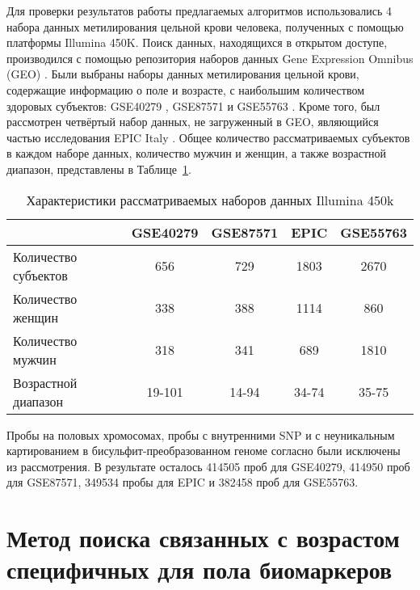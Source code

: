 Для проверки результатов работы предлагаемых алгоритмов использовались 4 набора данных метилирования цельной крови человека, полученных с помощью платформы Illumina 450K. Поиск данных, находящихся в открытом доступе, производился с помощью репозитория наборов данных Gene Expression Omnibus (GEO) \autocite{Barrett2012}. Были выбраны наборы данных метилирования цельной крови, содержащие информацию о поле и возрасте, с наибольшим количеством здоровых субъектов: GSE40279 \autocite{Hannum2013}, GSE87571 \autocite{Johansson2013} и GSE55763 \autocite{Lehne2015}. Кроме того, был рассмотрен четвёртый набор данных, не загруженный в GEO, являющийся частью исследования EPIC Italy \autocite{Palli2003}. Общее количество рассматриваемых субъектов в каждом наборе данных, количество мужчин и женщин, а также возрастной диапазон, представлены в Таблице~\ref{tab:Datasets}. 

\begin{table} [htbp]
	\centering
	\begin{threeparttable}
		\caption{Характеристики рассматриваемых наборов данных Illumina 450k}\label{tab:Datasets}
		\begin{SingleSpace}
			\begin{tabular}{| l | c | c | c | c |}
				\hline
				 & GSE40279 & GSE87571 & EPIC & GSE55763 \\
				\hline
				Количество субъектов & 656 & 729 & 1803 & 2670 \\
				\hline
				Количество женщин & 338 & 388 & 1114 & 860 \\
				\hline
				Количество мужчин & 318 & 341 & 689 & 1810 \\
				\hline
				Возрастной диапазон & 19-101 & 14-94 & 34-74 & 35-75 \\
				\hline
			\end{tabular}%
		\end{SingleSpace}
	\end{threeparttable}
\end{table}

Пробы на половых хромосомах, пробы с внутренними SNP и с неуникальным картированием в бисульфит-преобразованном геноме согласно \autocite{Zhou2016} были исключены из рассмотрения. В результате осталось 414505 проб для GSE40279, 414950 проб для GSE87571, 349534 пробы для EPIC и 382458 проб для GSE55763. 

\section{Метод поиска связанных с возрастом специфичных для пола биомаркеров}\label{sec:ch2/sec2}

